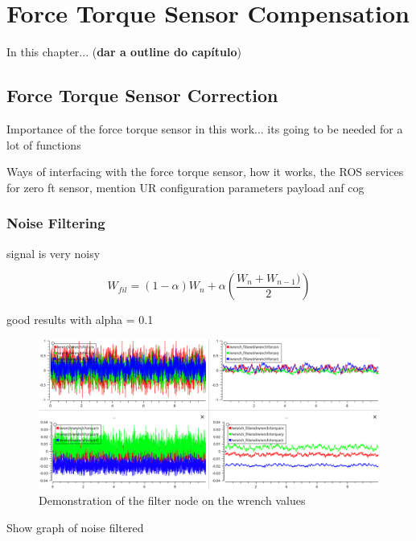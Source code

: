\chapter{Force Torque Sensor Compensation}
\label{chapter:ft-sensor-correction}

\par In this chapter... (\textbf{dar a outline do capítulo})

\section{Force Torque Sensor Correction}

\par Importance of the force torque sensor in this work... its going to be needed for a lot of functions

\par Ways of interfacing with the force torque sensor, how it works, the ROS services for zero ft sensor, mention UR configuration parameters payload anf cog

\subsection{Noise Filtering}

\par signal is very noisy

\[ W_{fil} = (1-\alpha)W_n + \alpha \left(\frac{W_n + W_{n-1})}{2}\right) \]

\par good results with alpha = 0.1

\begin{figure}[h]
    \centering
    \includegraphics[width=0.9\linewidth]{figs/chp3/ft_sensor_filter.png}
    \caption{Demonstration of the filter node on the wrench values}
    \label{fig:ft_sensor_filter}
\end{figure}

\par Show graph of noise filtered


